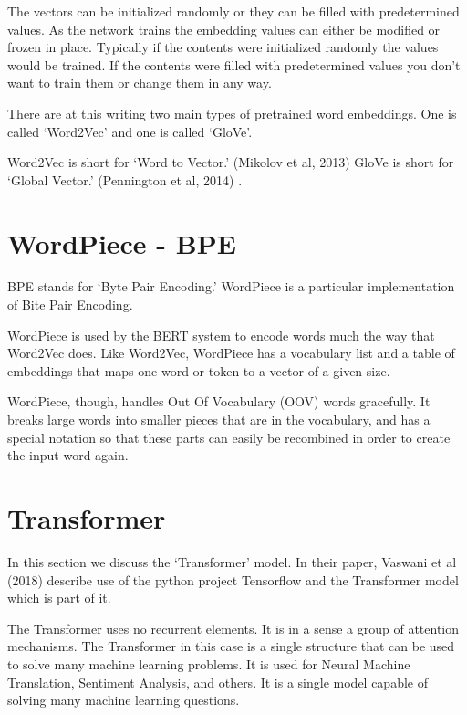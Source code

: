 The vectors can be initialized randomly or they can be filled with
predetermined values. As the network trains the embedding values can
either be modified or frozen in place. Typically if the contents were
initialized randomly the values would be trained. If the contents
were filled with predetermined values you don\textquoteright t want
to train them or change them in any way. 

There are at this writing two main types of pretrained word embeddings.
One is called \textquoteleft Word2Vec\textquoteright{} and one is
called \textquoteleft GloVe\textquoteright . 

Word2Vec is short for \textquoteleft Word to Vector.\textquoteright{}
(Mikolov et al, 2013)\cite{mikolov2013efficient} GloVe is short for \textquoteleft Global
Vector.\textquoteright{} (Pennington et al, 2014)\cite{pennington-etal-2014-glove} .


\section{WordPiece - BPE}

\ac{BPE} stands for `Byte Pair Encoding.' WordPiece is a particular implementation of Bite Pair Encoding.

WordPiece is used by the BERT system to encode words much the way that Word2Vec does.
Like Word2Vec, WordPiece  has a vocabulary list and a table of embeddings that maps one
word or token to a vector of a given size.

WordPiece, though, handles Out Of Vocabulary (OOV) words gracefully. It breaks large words
into smaller pieces that are in the vocabulary, and has a special notation so that
these parts can easily be recombined in order to create the input word again.


\section{Transformer}

In this section we discuss the `Transformer' model. In their paper, Vaswani et al (2018)\cite{tensor2tensor} describe use of the python project Tensorflow and the Transformer model which is part of it.

The Transformer uses no recurrent elements. It is in a sense a group of attention mechanisms. The Transformer in this case is a single structure that can be used to solve many machine learning problems. It is used for Neural Machine Translation, Sentiment Analysis, and others. It is a single model capable of solving many machine learning questions.


